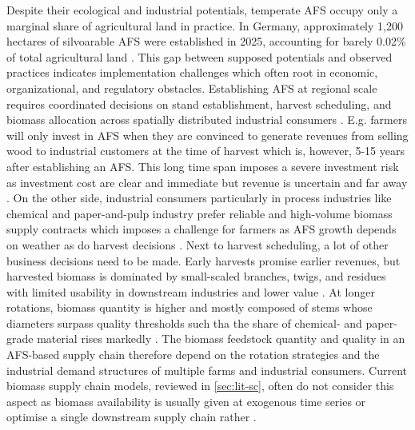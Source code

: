 \documentclass[APA,TimesLARGE]{WileyNJDv5} %
\begin{document}
Despite their ecological and industrial potentials, temperate AFS occupy only a marginal share of agricultural land in practice. In Germany, approximately 1,200 hectares of silvoarable AFS were established in 2025, accounting for barely 0.02\% of total agricultural land \cite{DEFAF}. This gap between supposed potentials and observed practices indicates implementation challenges which often root in economic, organizational, and regulatory obstacles. Establishing AFS at regional scale requires coordinated decisions on stand establishment, harvest scheduling, and biomass allocation across spatially distributed industrial consumers \cite{Low2023mixed}. E.g. farmers will only invest in AFS when they are convinced to generate revenues from selling wood to industrial customers at the time of harvest which is, however, 5-15 years after establishing an AFS. This long time span imposes a severe investment risk as investment cost are clear and immediate but revenue is uncertain and far away \cite{Millard2011}. On the other side, industrial consumers particularly in process industries like chemical and paper-and-pulp industry prefer reliable and high-volume biomass supply contracts which imposes a challenge for farmers as AFS growth depends on weather as do harvest decisions \cite{harayama2020weather}. Next to harvest scheduling, a lot of other business decisions need to be made. Early harvests promise earlier revenues, but harvested biomass is dominated by small-scaled branches, twigs, and residues with limited usability in downstream industries and lower value \cite{kauter2003biomassquality}. At longer rotations, biomass quantity is higher and mostly composed of stems whose diameters surpass quality thresholds such tha the share of chemical- and paper-grade material rises markedly \cite{Huber2018_SRAFS_growth,Niemczyk2021_Poplar_Rotation}. The biomass feedstock quantity and quality in an AFS-based supply chain therefore depend on the rotation strategies and the industrial demand structures of multiple farms and industrial consumers. Current biomass supply chain models, reviewed in \autoref{sec:lit-sc}, often do not consider this aspect as biomass availability is usually given at exogenous time series or optimise a single downstream supply chain rather \cite{Zahraee2020_BSC_review,DeMeyer2016_tOPTIMASS}.
\end{document}
